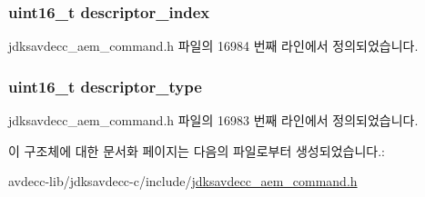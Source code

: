 \subsubsection[{\texorpdfstring{descriptor\+\_\+index}{descriptor_index}}]{\setlength{\rightskip}{0pt plus 5cm}uint16\+\_\+t descriptor\+\_\+index}\hypertarget{structjdksavdecc__aem__command__set__control__response_a042bbc76d835b82d27c1932431ee38d4}{}\label{structjdksavdecc__aem__command__set__control__response_a042bbc76d835b82d27c1932431ee38d4}


jdksavdecc\+\_\+aem\+\_\+command.\+h 파일의 16984 번째 라인에서 정의되었습니다.

\subsubsection[{\texorpdfstring{descriptor\+\_\+type}{descriptor_type}}]{\setlength{\rightskip}{0pt plus 5cm}uint16\+\_\+t descriptor\+\_\+type}\hypertarget{structjdksavdecc__aem__command__set__control__response_ab7c32b6c7131c13d4ea3b7ee2f09b78d}{}\label{structjdksavdecc__aem__command__set__control__response_ab7c32b6c7131c13d4ea3b7ee2f09b78d}


jdksavdecc\+\_\+aem\+\_\+command.\+h 파일의 16983 번째 라인에서 정의되었습니다.



이 구조체에 대한 문서화 페이지는 다음의 파일로부터 생성되었습니다.\+:\begin{DoxyCompactItemize}
\item 
avdecc-\/lib/jdksavdecc-\/c/include/\hyperlink{jdksavdecc__aem__command_8h}{jdksavdecc\+\_\+aem\+\_\+command.\+h}\end{DoxyCompactItemize}
